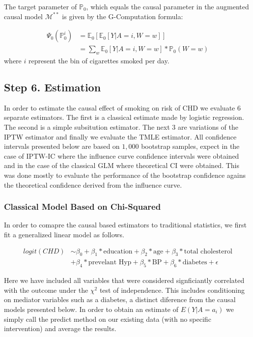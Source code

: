 \documentclass[]{article}
\begin{document}
The target parameter of \(\mathbb{P}_0\), which equals the causal
parameter in the augmented causal model \(\mathcal{M}^{**}\) is given by
the G-Computation formula:

\[
\begin{aligned}
\Psi_0(\mathbb{P}^i_0)&=\mathbb{E}_0[\mathbb{E}_0[Y|A= i,W=w]]\\
&= \sum_w\mathbb{E}_0[Y|A=i,W=w]*\mathbb{P}_0(W=w)
\end{aligned}
\] where \(i\) represent the bin of cigarettes smoked per day.

\hypertarget{step-6.-estimation}{%
\subsection{Step 6. Estimation}\label{step-6.-estimation}}

In order to estimate the causal effect of smoking on risk of CHD we
evaluate 6 separate estimators. The first is a classical estimate made
by logistic regression. The second is a simple subsitution estimator.
The next 3 are variations of the IPTW estimator and finally we evaluate
the TMLE estimator. All confidence intervals presented below are based
on \(1,000\) bootstrap samples, expect in the case of IPTW-IC where the
influence curve confidence intervals were obtained and in the case of
the classical GLM where theoretical CI were obtained. This was done
mostly to evaluate the performance of the bootstrap confidence agains
the theoretical confidence derived from the influence curve.

\hypertarget{classical-model-based-on-chi-squared}{%
\subsubsection{Classical Model Based on
Chi-Squared}\label{classical-model-based-on-chi-squared}}

In order to comapre the causal based estimators to traditional
statistics, we first fit a generalized linear model as follows.

\[
\begin{aligned}
logit(CHD) &\sim \beta_0 + \beta_1*\text{education} + \beta_2*\text{age} +\beta_3*\text{total cholesterol}\\
&+\beta_4*\text{prevelant Hyp} + \beta_5*\text{BP} + \beta_6*\text{diabetes} + \epsilon
\end{aligned}
\]

Here we have included all variables that were considered signficiantly
correlated with the outcome under the \(\chi^2\) test of independence.
This includes conditioning on mediator variables such as a diabetes, a
distinct diference from the causal models presented below. In order to
obtain an estimate of \(E(Y | A=a_i)\) we simply call the predict method
on our existing data (with no specific intervention) and average the
results.
\end{document}
